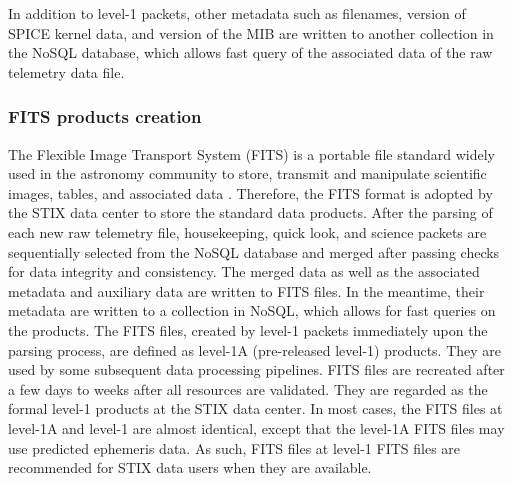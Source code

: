 \documentclass[referee]{preaa} %
\begin{document}
In addition to level-1 packets,  other metadata such as filenames, version of SPICE kernel data, and version of the MIB are written to another collection in the NoSQL database, which allows fast query of the associated data of the raw telemetry data file.

\subsubsection{FITS products creation}
The Flexible Image Transport System (FITS)  is a portable file standard widely used in the astronomy community to store, transmit and manipulate scientific images, tables, and associated data \citep{fits}.
Therefore, the FITS format is adopted by the STIX data center to store the standard data products. 
After the parsing of each new raw telemetry file, housekeeping, quick look, and science packets are sequentially selected from the NoSQL database and merged after passing checks for data integrity and consistency.  The merged data as well as the associated metadata and auxiliary data are written to FITS files.  In the meantime, their metadata are written to a collection in NoSQL, which allows for fast queries on the products. The FITS files, created by level-1 packets immediately upon the parsing process, are defined as level-1A (pre-released level-1) products.  They are used by some subsequent data processing pipelines.  
FITS files are recreated after a few days to weeks after all resources are validated.
They are regarded as the formal level-1 products at the STIX data center. 
In most cases, the FITS files at level-1A and level-1 are almost identical, except that the level-1A FITS files may use predicted ephemeris data. As such, FITS files at level-1 FITS files are recommended for STIX data users when they are available. 
\end{document}
